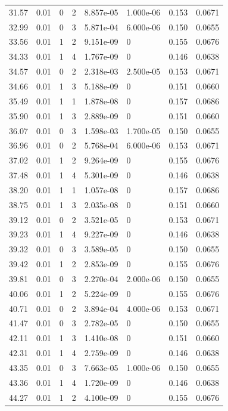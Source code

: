 \documentclass[preview]{standalone}
\begin{document}
{{{\begin{tabular}{L{1.2cm}C{1.2cm} C{0.3cm}C{0.5cm} C{1.4cm}C{1.4cm} C{1.4cm}C{1.4cm}}
  31.57  &  0.01  & 0     &  2 &  8.857e-05  & 1.000e-06  & 0.153 &  0.0671   \\ 
  32.99  &  0.01  & 0     &  3 &  5.871e-04  & 6.000e-06  & 0.150 &  0.0655   \\ 
  33.56  &  0.01  & 1     &  2 &  9.151e-09  & 0  & 0.155 &  0.0676   \\ 
  34.33  &  0.01  & 1     &  4 &  1.767e-09  & 0  & 0.146 &  0.0638   \\ 
  34.57  &  0.01  & 0     &  2 &  2.318e-03  & 2.500e-05  & 0.153 &  0.0671   \\ 
  34.66  &  0.01  & 1     &  3 &  5.188e-09  & 0  & 0.151 &  0.0660   \\ 
  35.49  &  0.01  & 1     &  1 &  1.878e-08  & 0  & 0.157 &  0.0686   \\ 
  35.90  &  0.01  & 1     &  3 &  2.889e-09  & 0  & 0.151 &  0.0660   \\ 
  36.07  &  0.01  & 0     &  3 &  1.598e-03  & 1.700e-05  & 0.150 &  0.0655   \\ 
  36.96  &  0.01  & 0     &  2 &  5.768e-04  & 6.000e-06  & 0.153 &  0.0671   \\ 
  37.02  &  0.01  & 1     &  2 &  9.264e-09  & 0  & 0.155 &  0.0676   \\ 
  37.48  &  0.01  & 1     &  4 &  5.301e-09  & 0  & 0.146 &  0.0638   \\ 
  38.20  &  0.01  & 1     &  1 &  1.057e-08  & 0  & 0.157 &  0.0686   \\ 
  38.75  &  0.01  & 1     &  3 &  2.035e-08  & 0  & 0.151 &  0.0660   \\ 
  39.12  &  0.01  & 0     &  2 &  3.521e-05  & 0  & 0.153 &  0.0671   \\ 
  39.23  &  0.01  & 1     &  4 &  9.227e-09  & 0  & 0.146 &  0.0638   \\ 
  39.32  &  0.01  & 0     &  3 &  3.589e-05  & 0  & 0.150 &  0.0655   \\ 
  39.42  &  0.01  & 1     &  2 &  2.853e-09  & 0  & 0.155 &  0.0676   \\ 
  39.81  &  0.01  & 0     &  3 &  2.270e-04  & 2.000e-06  & 0.150 &  0.0655   \\ 
  40.06  &  0.01  & 1     &  2 &  5.224e-09  & 0  & 0.155 &  0.0676   \\ 
  40.71  &  0.01  & 0     &  2 &  3.894e-04  & 4.000e-06  & 0.153 &  0.0671   \\ 
  41.47  &  0.01  & 0     &  3 &  2.782e-05  & 0  & 0.150 &  0.0655   \\ 
  42.11  &  0.01  & 1     &  3 &  1.410e-08  & 0  & 0.151 &  0.0660   \\ 
  42.31  &  0.01  & 1     &  4 &  2.759e-09  & 0  & 0.146 &  0.0638   \\ 
  43.35  &  0.01  & 0     &  3 &  7.663e-05  & 1.000e-06  & 0.150 &  0.0655   \\ 
  43.36  &  0.01  & 1     &  4 &  1.720e-09  & 0  & 0.146 &  0.0638   \\ 
  44.27  &  0.01  & 1     &  2 &  4.100e-09  & 0  & 0.155 &  0.0676   \\ 
\hline 
\end{tabular} 

}}}
\end{document}
